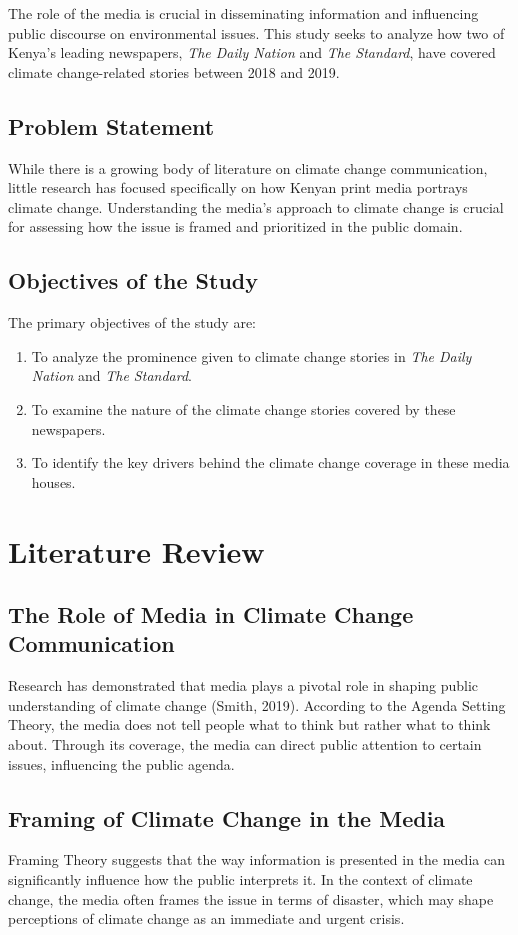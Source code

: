 \documentclass[12pt]{report}
\begin{document}
    The role of the media is crucial in disseminating information and influencing public discourse on environmental issues. This study seeks to analyze how two of Kenya's leading newspapers, \textit{The Daily Nation} and \textit{The Standard}, have covered climate change-related stories between 2018 and 2019.

\section{Problem Statement}
    While there is a growing body of literature on climate change communication, little research has focused specifically on how Kenyan print media portrays climate change. Understanding the media's approach to climate change is crucial for assessing how the issue is framed and prioritized in the public domain.

\section{Objectives of the Study}
    The primary objectives of the study are:
    \begin{enumerate}
        \item To analyze the prominence given to climate change stories in \textit{The Daily Nation} and \textit{The Standard}.
        \item To examine the nature of the climate change stories covered by these newspapers.
        \item To identify the key drivers behind the climate change coverage in these media houses.
    \end{enumerate}

\chapter{Literature Review}
\section{The Role of Media in Climate Change Communication}
    Research has demonstrated that media plays a pivotal role in shaping public understanding of climate change (Smith, 2019). According to the Agenda Setting Theory, the media does not tell people what to think but rather what to think about. Through its coverage, the media can direct public attention to certain issues, influencing the public agenda.

\section{Framing of Climate Change in the Media}
    Framing Theory suggests that the way information is presented in the media can significantly influence how the public interprets it. In the context of climate change, the media often frames the issue in terms of disaster, which may shape perceptions of climate change as an immediate and urgent crisis.
\end{document}
